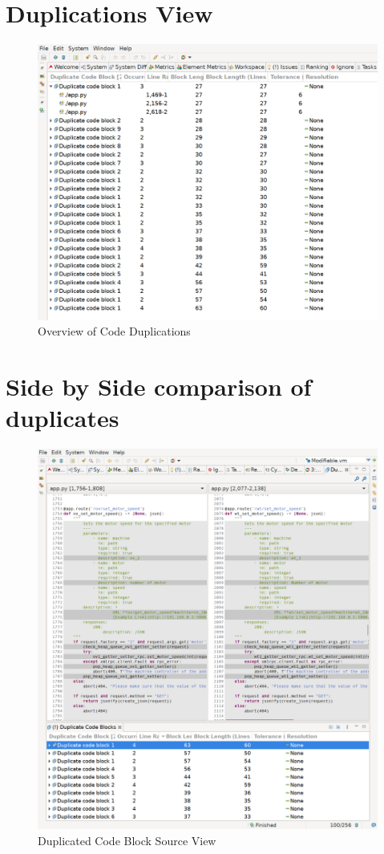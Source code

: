 \newpage
\section{Duplications View}
\begin{figure}[htp]
    \centering
    \includegraphics[width=\textwidth, frame]{./latex/appendix/duplications}
    \caption{Overview of Code Duplications}
    \label{appendix:duplications}
\end{figure}

\newpage
\section{Side by Side comparison of duplicates}
\begin{figure}[htp]
    \centering
    \includegraphics[width=0.9\columnwidth, frame]{./latex/appendix/duplicate-view}
    \caption{Duplicated Code Block Source View}
    \label{appendix:duplications-view}
\end{figure}